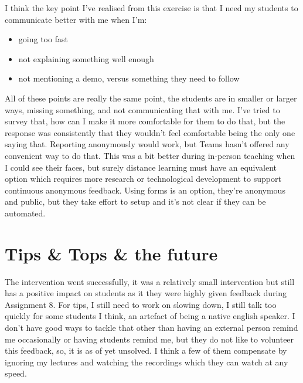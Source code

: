 \documentclass[paper=a4,justified,a4paper]{tufte-handout}
\providecommand{\tightlist}{%
  \setlength{\itemsep}{0pt}\setlength{\parskip}{0pt}}
\begin{document}
I think the key point I've realised from this exercise is that I need my
students to communicate better with me when I'm:

\begin{itemize}
\tightlist
\item
  going too fast
\item
  not explaining something well enough
\item
  not mentioning a demo, versus something they need to follow
\end{itemize}

All of these points are really the same point, the students are in
smaller or larger ways, missing something, and not communicating that
with me. I've tried to survey that, how can I make it more comfortable
for them to do that, but the response was consistently that they
wouldn't feel comfortable being the only one saying that. Reporting
anonymously would work, but Teams hasn't offered any convenient way to
do that. This was a bit better during in-person teaching when I could
see their faces, but surely distance learning must have an equivalent
option which requires more research or technological development to
support continuous anonymous feedback. Using forms is an option, they're
anonymous and public, but they take effort to setup and it's not clear
if they can be automated.

\hypertarget{tips-tops-the-future}{%
\section{Tips \& Tops \& the future}\label{tips-tops-the-future}}

The intervention went successfully, it was a relatively small
intervention but still has a positive impact on students as it they were
highly given feedback during Assignment 8. For tips, I still need to
work on slowing down, I still talk too quickly for some students I
think, an artefact of being a native english speaker. I don't have good
ways to tackle that other than having an external person remind me
occasionally or having students remind me, but they do not like to
volunteer this feedback, so, it is as of yet unsolved. I think a few of
them compensate by ignoring my lectures and watching the recordings
which they can watch at any speed.
\end{document}
